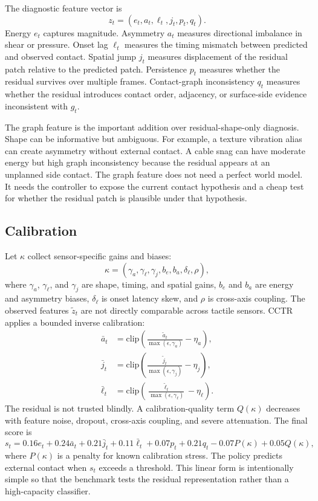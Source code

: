 \documentclass{article}
\newcommand{\method}{CCTR}
\begin{document}
The diagnostic feature vector is
\[
z_t = (e_t, a_t, \ell_t, j_t, p_t, q_t).
\]
Energy $e_t$ captures magnitude. Asymmetry $a_t$ measures directional imbalance in shear or pressure. Onset lag $\ell_t$ measures the timing mismatch between predicted and observed contact. Spatial jump $j_t$ measures displacement of the residual patch relative to the predicted patch. Persistence $p_t$ measures whether the residual survives over multiple frames. Contact-graph inconsistency $q_t$ measures whether the residual introduces contact order, adjacency, or surface-side evidence inconsistent with $g_t$.

The graph feature is the important addition over residual-shape-only diagnosis. Shape can be informative but ambiguous. For example, a texture vibration alias can create asymmetry without external contact. A cable snag can have moderate energy but high graph inconsistency because the residual appears at an unplanned side contact. The graph feature does not need a perfect world model. It needs the controller to expose the current contact hypothesis and a cheap test for whether the residual patch is plausible under that hypothesis.

\subsection{Calibration}

Let $\kappa$ collect sensor-specific gains and biases:
\[
\kappa = (\gamma_a, \gamma_\ell, \gamma_j, b_e, b_a, \delta_\ell, \rho),
\]
where $\gamma_a$, $\gamma_\ell$, and $\gamma_j$ are shape, timing, and spatial gains, $b_e$ and $b_a$ are energy and asymmetry biases, $\delta_\ell$ is onset latency skew, and $\rho$ is cross-axis coupling. The observed features $\tilde{z}_t$ are not directly comparable across tactile sensors. \method{} applies a bounded inverse calibration:
\[
\begin{aligned}
\bar{a}_t &= \mathrm{clip}\left(\frac{\tilde{a}_t}{\max(\epsilon,\gamma_a)} - \eta_a\right),\\
\bar{j}_t &= \mathrm{clip}\left(\frac{\tilde{j}_t}{\max(\epsilon,\gamma_j)} - \eta_j\right),\\
\bar{\ell}_t &= \mathrm{clip}\left(\frac{\tilde{\ell}_t}{\max(\epsilon,\gamma_\ell)} - \eta_\ell\right).
\end{aligned}
\]
The residual is not trusted blindly. A calibration-quality term $Q(\kappa)$ decreases with feature noise, dropout, cross-axis coupling, and severe attenuation. The final score is
\[
s_t =
0.16 e_t + 0.24 \bar{a}_t + 0.21 \bar{j}_t + 0.11 \bar{\ell}_t
+ 0.07 p_t + 0.21 q_t - 0.07 P(\kappa) + 0.05 Q(\kappa),
\]
where $P(\kappa)$ is a penalty for known calibration stress. The policy predicts external contact when $s_t$ exceeds a threshold. This linear form is intentionally simple so that the benchmark tests the residual representation rather than a high-capacity classifier.
\end{document}
